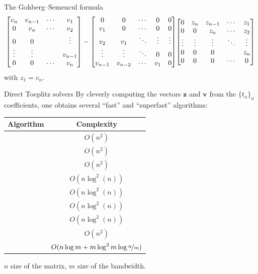 \documentclass[aspectratio=169,xcolor=dvipsnames]{beamer}
\begin{document}
\begin{frame}{The Gohberg--Semencul formula}
\[\begin{bmatrix}
	v_{n} & v_{n-1} & \cdots & v_{1} \\
	0 & v_n & \cdots & v_{2} \\
	0 & 0 &  & \vdots \\
	\vdots & \vdots & & v_{n-1} \\
	0 & 0 & \cdots & v_n
\end{bmatrix} - \begin{bmatrix}
	0 & 0 & \cdots & 0  & 0 \\
	v_1 & 0 & \cdots & 0 & 0 \\
	v_2 & v_1 & \ddots & \vdots & \vdots \\
	\vdots & \vdots & \ddots & 0 & 0 \\
	v_{n-1} & v_{n-2} & \cdots & v_1 & 0
\end{bmatrix}\hspace{-0.2em}\begin{bmatrix}
	0 & z_{n} & z_{n-1} & \cdots & z_{1} \\
	0 & 0 & z_{n} & \cdots & z_{2} \\
	\vdots & \vdots & \vdots & \ddots & \vdots \\
	0 & 0 & 0 & & z_{n} \\
	0 & 0 & 0 & \cdots & 0
\end{bmatrix}
\]
with $z_1 = v_n$.
\end{frame}

\begin{frame}{Direct Toeplitz solvers}
By cleverly computing the vectors $\mathbf{z}$ and $\mathbf{v}$ from the $\{t_n\}_n$ coefficients, one obtains several ``fast'' and ``superfast'' algorithms:
\begin{center}
\begin{tabular}{lc}
	\toprule
	Algorithm & Complexity \\
	\midrule
	\cite{levinson1946wiener} & $O(n^2)$ \\
	\cite{trench1964algorithm} & $O(n^2)$ \\
	\cite{zohar1974solution} & $O(n^2)$ \\
	\cite{bitmead1980asymptotically} & $O(n \log^2(n))$\\
	\cite{brent1980fast} & $O(n\log^2(n))$ \\
	\cite{de1987new} & $O(n\log^2(n))$ \\
	\cite{ammar1988superfast} & $O(n \log^2(n))$\\
	\cite{chan1992look} & $O(n^2)$ \\
	\midrule
	\cite{MR1685049} & $O(n \log m + m \log^2 m \log \nicefrac{n}{m})$\\
	\bottomrule
\end{tabular}

$n$ size of the matrix, $m$ size of the bandwidth.
\end{center}
\end{frame}
\end{document}
